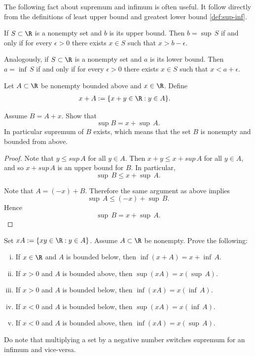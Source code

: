 \documentclass[12pt]{book}
\begin{document}
The following fact about supremum and infimum is often useful.
It follow directly from the definitions of least upper bound and greatest lower bound \ref{def:sup-inf}.

\begin{prop} \label{prop:existsxepsfromsup}
If $S \subset \R$ is a nonempty set and $b$ is its upper bound.
Then $b=\sup\, S$ if and only if for every $\epsilon > 0$ there exists $x \in S$ such
that $x>b - \epsilon$.

Analogously, if $S \subset \R$ is a nonempty set and $a$ is its lower bound.
Then $a=\inf\, S$ if and only if for every $\epsilon > 0$ there exists $x \in S$ such
that $x<a + \epsilon$.
\end{prop}
 
\begin{example}\label{ex:sup(x+A)}
Let $A \subset \R$ be nonempty bounded above and $x \in \R$.
Define
\begin{align*}
x + A & := \{ x+y \in \R : y \in A \}. 
\end{align*}

Assume $B=A+x$. Show that 
$$\sup B = x + \sup\, A.$$
In particular supremum of $B$ exists, which means that the set $B$ is nonempty and bounded from above.

\begin{proof}
Note that $y \leq sup\, A$ for all $y \in A$.
Then $x+y \leq x+sup\, A$ for all $y \in A$, and so $x+sup\, A$ is an upper
bound for $B$.
In particular, 
\begin{equation*}
\sup\, B \leq  x+ \sup\, A.
\end{equation*}

Note that $A=(-x)+B$.
Therefore the same argument as above implies 
\begin{equation*}
\sup\, A \leq  (-x)+ \sup\, B.
\end{equation*}
Hence 
\begin{equation*}
\sup\, B =  x+ \sup\, A.
\end{equation*}
\end{proof}
\end{example}

\begin{exercise}
\label{prop:supinfalg}
Set $xA  := \{ xy \in \R : y \in A \}$.
Assume $A \subset \R$ be nonempty. 
Prove the following:
\begin{enumerate}[(i)]
\item If $x \in \R$ and $A$ is bounded below, then $\inf (x+A) = x + \inf\, A$.
\item If $x > 0$ and $A$ is bounded above, then $\sup (xA) = x ( \sup\, A )$.
\item If $x > 0$ and $A$ is bounded below, then $\inf (xA) = x ( \inf\, A )$.
\item If $x < 0$ and $A$ is bounded below, then $\sup (xA) = x ( \inf\, A )$.
\item If $x < 0$ and $A$ is bounded above, then $\inf (xA) = x ( \sup\, A )$.
\end{enumerate}
Do note that multiplying a set by a negative number switches supremum for an infimum and vice-versa.  
\end{exercise}
\end{document}
